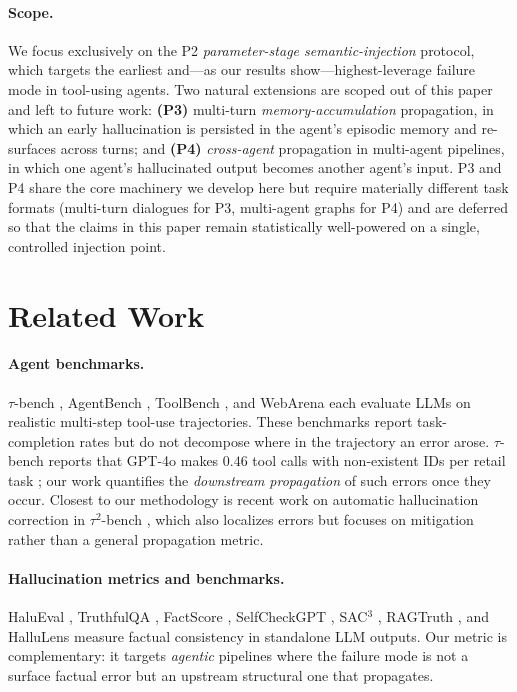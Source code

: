 \documentclass[11pt]{article}
\newcommand{\eps}{\mathrm{EPS}}
\begin{document}
\paragraph{Scope.} We focus exclusively on the P2 \emph{parameter-stage semantic-injection} protocol, which targets the earliest and---as our results show---highest-leverage failure mode in tool-using agents. Two natural extensions are scoped out of this paper and left to future work: \textbf{(P3)} multi-turn \emph{memory-accumulation} propagation, in which an early hallucination is persisted in the agent's episodic memory and re-surfaces across turns; and \textbf{(P4)} \emph{cross-agent} propagation in multi-agent pipelines, in which one agent's hallucinated output becomes another agent's input. P3 and P4 share the core \eps{} machinery we develop here but require materially different task formats (multi-turn dialogues for P3, multi-agent graphs for P4) and are deferred so that the claims in this paper remain statistically well-powered on a single, controlled injection point.

\section{Related Work}
\label{sec:related}

\paragraph{Agent benchmarks.} $\tau$-bench \citep{tau-bench}, AgentBench \citep{agentbench}, ToolBench \citep{toolbench}, and WebArena \citep{webarena} each evaluate LLMs on realistic multi-step tool-use trajectories. These benchmarks report task-completion rates but do not decompose where in the trajectory an error arose. $\tau$-bench reports that GPT-4o makes $0.46$ tool calls with non-existent IDs per retail task \citep{tau-bench}; our work quantifies the \emph{downstream propagation} of such errors once they occur. Closest to our methodology is recent work on automatic hallucination correction in $\tau^2$-bench \citep{cleanlab-tau2}, which also localizes errors but focuses on mitigation rather than a general propagation metric.

\paragraph{Hallucination metrics and benchmarks.} HaluEval \citep{halueval}, TruthfulQA \citep{truthfulqa}, FactScore \citep{factscore}, SelfCheckGPT \citep{selfcheckgpt}, SAC$^3$ \citep{sac3}, RAGTruth \citep{ragtruth}, and HalluLens \citep{hallulens} measure factual consistency in standalone LLM outputs. Our \eps{} metric is complementary: it targets \emph{agentic} pipelines where the failure mode is not a surface factual error but an upstream structural one that propagates.
\end{document}
